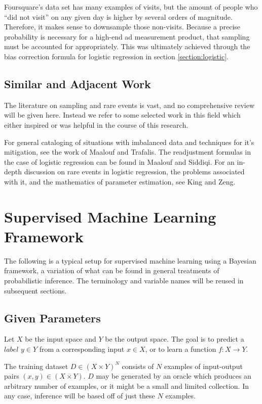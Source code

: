 \documentclass[twoside]{article}
\begin{document}
Foursquare's data set has many examples of visits, but the amount of people who “did not visit” on any given day is higher by several orders of magnitude. Therefore, it makes sense to downsample those non-visits. Because a precise probability is necessary for a high-end ad measurement product, that sampling must be accounted for appropriately. This was ultimately achieved through the bias correction formula for logistic regression in section \ref{section:logistic}.

\subsection{Similar and Adjacent Work}

The literature on sampling and rare events is vast, and no comprehensive review will be given here. Instead we refer to some selected work in this field which either inspired or was helpful in the course of this research.

For general cataloging of situations with imbalanced data and techniques for it's mitigation, see the work of Maalouf and Trafalis\cite{rareevents}. The readjustment formulas in the case of logistic regression can be found in Maalouf and Siddiqi\cite{weightedlogistic}. For an in-depth discussion on rare events in logistic regression, the problems associated with it, and the mathematics of parameter estimation, see King and Zeng\cite{king}.

\section{Supervised Machine Learning Framework} \label{framework}

The following is a typical setup for supervised machine learning using a Bayesian framework, a variation of what can be found in general treatments of probabilistic inference\cite{pythonbayes}\cite{gelmanbayes}\cite{blais}. The terminology and variable names will be reused in subsequent sections.

\subsection{Given Parameters}

Let \(X\) be the input space and \(Y\) be the output space. The goal is to predict a \(label\) \(y \in Y\) from a corresponding input \(x \in X\), or to learn a function \(f: X \to Y\).

The training dataset \(D \in (X \times Y)^N\) consists of \(N\) examples of input-output pairs \((x, y) \in (X \times Y) \). \(D\) may be generated by an oracle which produces an arbitrary number of examples, or it might be a small and limited collection. In any case, inference will be based off of just these \(N\) examples.
\end{document}
